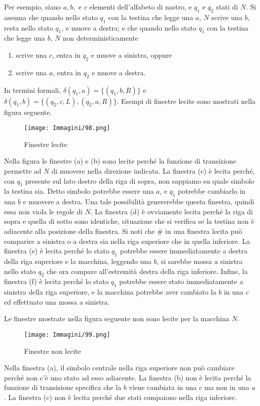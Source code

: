 \documentclass{article}
\begin{document}
Per esempio, siano $a, b,$ e $c$ elementi dell'alfabeto di nastro, e $q_1$ e $q_2$ stati di $N$. 
Si assuma che quando nello stato $q_1$ con la testina che legge una $a$, $N$ scrive una $b$, resta nello stato $q_1$, e muove a destra; e che quando nello stato $q_1$ con la testina che legge una $b$, $N$ non deterministicamente
\begin{enumerate}
    \item scrive una $c$, entra in $q_2$ e muove a sinistra, oppure
    \item scrive una $a$, entra in $q_2$ e muove a destra.
\end{enumerate}
In termini formali, $\delta(q_1,a) = \{(q_1,b,R)\}$ e $\delta(q_1,b) = \{(q_2,c,L), (q_2,a,R)\}$.
Esempi di finestre lecite sono mostrati nella figura seguente.
\begin{figure}[H]
    \centering
    \texttt{[image: Immagini/98.png]}
    \caption{Finestre lecite}
    \label{fig:finestre}
\end{figure}
Nella figura le finestre (a) e (b) sono lecite perché la funzione di transizione permette ad $N$ di muovere nella direzione indicata.
La finestra (c) è lecita perché, con $q_1$ presente sul lato destro della riga di sopra, non sappiamo su quale simbolo la testina sia.
Detto simbolo potrebbe essere una $a$, e $q_1$ potrebbe cambiarlo in una $b$ e muovere a destra. 
Una tale possibilità genererebbe questa finestra, quindi essa non viola le regole di $N$.
La finestra (d) è ovviamente lecita perché la riga di sopra e quella di sotto sono identiche, situazione che si verifica se la testina non è adiacente alla posizione della finestra. 
Si noti che \# in una finestra lecita può comparire a sinistra o a destra sia nella riga superiore che in quella inferiore.
La finestra (e) è lecita perché lo stato $q_1$ potrebbe essere immediatamente a destra della riga superiore e la macchina, leggendo una $b$, si sarebbe mossa a sinistra nello stato $q_2$ che ora compare all'estremità destra della riga inferiore. 
Infine, la finestra (f) è lecita perché lo stato $q_1$ potrebbe essere stato immediatamente a sinistra della riga superiore, e la macchina potrebbe aver cambiato la $b$ in una $c$ ed effettuato una mossa a sinistra.

Le finestre mostrate nella figura seguente non sono lecite per la macchina $N$.
\begin{figure}[H]
    \centering
    \texttt{[image: Immagini/99.png]}
    \caption{Finestre non lecite}
    \label{fig:finestre-non-lecite}
\end{figure}
Nella finestra (a), il simbolo centrale nella riga superiore non può cambiare perché non c'è uno stato ad esso adiacente. 
La finestra (b) non è lecita perché la funzione di transizione specifica che la $b$ viene cambiata in una $c$ ma non in una $a$.
La finestra (c) non è lecita perché due stati compaiono nella riga inferiore.
\end{document}
